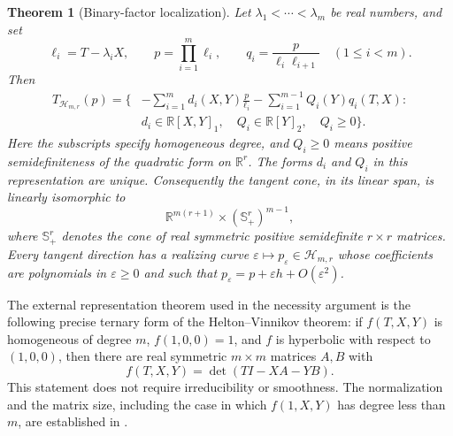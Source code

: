 \documentclass[reqno]{amsart}
\newtheorem{theorem}{Theorem}[section]
\theoremstyle{definition}
\theoremstyle{remark}
\newcommand{\R}{\mathbb R}
\begin{document}
\begin{theorem}[Binary-factor localization]\label{herm:binary-localization}
Let $\lambda_1<\cdots<\lambda_m$ be real numbers, and set
\[
 \ell_i=T-\lambda_iX,\qquad
 p=\prod_{i=1}^m\ell_i,\qquad
 q_i=\frac{p}{\ell_i\ell_{i+1}}\quad(1\leq i<m).
\]
Then
\begin{equation}\label{herm:binary-tangent-formula}
\begin{aligned}
 T_{\mathcal H_{m,r}}(p)
 =\bigg\{&-\sum_{i=1}^m d_i(X,Y)\frac{p}{\ell_i}
           -\sum_{i=1}^{m-1}Q_i(Y)q_i(T,X):\\
         & d_i\in\R[X,Y]_1,\quad Q_i\in\R[Y]_2,
             \quad Q_i\geq0\bigg\}.
\end{aligned}
\end{equation}
Here the subscripts specify homogeneous degree, and $Q_i\geq0$
means positive semidefiniteness of the quadratic form on $\R^r$.
The forms $d_i$ and $Q_i$ in this representation are unique.  Consequently
the tangent cone, in its linear span, is linearly isomorphic to
\[
 \R^{m(r+1)}\times(\mathbb S_+^r)^{m-1},
\]
where $\mathbb S_+^r$ denotes the cone of real symmetric positive
semidefinite $r\times r$ matrices.  Every tangent direction has a realizing
curve $\varepsilon\mapsto p_\varepsilon\in\mathcal H_{m,r}$ whose
coefficients are polynomials in $\varepsilon\geq0$ and such that
$p_\varepsilon=p+\varepsilon h+O(\varepsilon^2)$.
\end{theorem}

The external representation theorem used in the necessity argument is
the following precise ternary form of the Helton--Vinnikov theorem:
if $f(T,X,Y)$ is homogeneous of degree $m$, $f(1,0,0)=1$, and $f$ is
hyperbolic with respect to $(1,0,0)$, then there are real symmetric
$m\times m$ matrices $A,B$ with
\begin{equation}\label{herm:ternary-determinant}
 f(T,X,Y)=\det(TI-XA-YB).
\end{equation}
This statement does not require irreducibility or smoothness.  The
normalization and the matrix size, including the case in which
$f(1,X,Y)$ has degree less than $m$, are established in
\cite[Eq.~(5) and pp.~2497--2498]{LewisParriloRamana05}.
\end{document}
